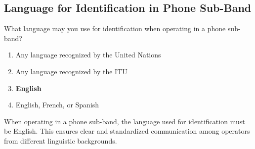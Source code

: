 \subsection{Language for Identification in Phone Sub-Band}
\label{T1F04}

\begin{tcolorbox}[colback=gray!10!white,colframe=black!75!black,title=T1F04]
What language may you use for identification when operating in a phone sub-band?
\begin{enumerate}[label=\Alph*,noitemsep]
    \item Any language recognized by the United Nations
    \item Any language recognized by the ITU
    \item \textbf{English}
    \item English, French, or Spanish
\end{enumerate}
\end{tcolorbox}

When operating in a phone sub-band, the language used for identification must be English. This ensures clear and standardized communication among operators from different linguistic backgrounds.